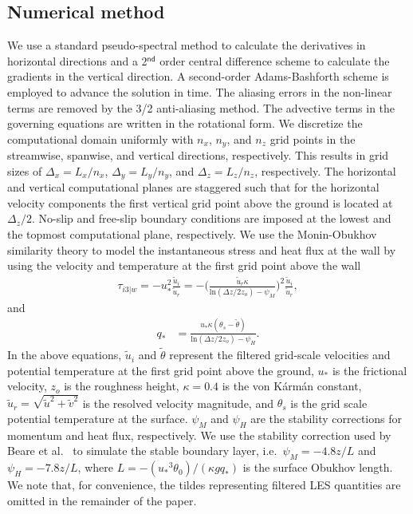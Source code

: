 \documentclass[%
 aip,
 amsmath,amssymb,
preprint,%
author-numerical,%
]{revtex4-1}
\begin{document}
\subsection{Numerical method}\label{sec2.2} 
We use a standard pseudo-spectral method to calculate the derivatives in horizontal directions and a 2$^\mathsf{nd}$ order central difference scheme to calculate the gradients in the vertical direction. A second-order Adams-Bashforth scheme is employed to advance the solution in time. The aliasing errors in the non-linear terms are removed by the 3/2 anti-aliasing method\cite{can88}. The advective terms in the governing equations are written in the rotational form\cite{fer02}. We discretize the computational domain uniformly with $n_x$, $n_y$, and $n_z$ grid points in the streamwise, spanwise, and vertical directions, respectively. This results in grid sizes of $\Delta_{x}=L_x/n_x$, $\Delta_{y}=L_y/n_y$, and $\Delta_{z}=L_z/n_z$, respectively. The horizontal and vertical computational planes are staggered such that for the horizontal velocity components the first vertical grid point above the ground is located at $\Delta_{z}/2$. No-slip and free-slip boundary conditions are imposed at the lowest and the topmost computational plane, respectively. We use the Monin-Obukhov similarity theory \cite{moe84} to model the instantaneous stress and heat flux at the wall by using the velocity and temperature at the first grid point above the wall
%
\begin{align}
\tau_{i3|w}=-{u_{*}^2}\frac{\widetilde{u}_i}{\widetilde{u}_r}=-\Bigg(\frac{\widetilde{u}_r\kappa}{\text{ln}(\Delta{z}/2z_o)-\psi_{M}}\Bigg)^2\frac{\widetilde{u}_i}{\widetilde{u}_r},\label{eqn6}
\end{align}
%
and
%
\begin{align} 
q_{*}&=\frac{u_{*}\kappa(\theta_s-\widetilde{\theta})}{\text{ln}(\Delta{z}/2z_o)-\psi_{H}}.\label{eqn7}
\end{align}
%
\noindent In the above equations, $\widetilde{u}_i$ and $\widetilde{\theta}$ represent the filtered grid-scale velocities and potential temperature at the first grid point above the ground, $u_*$ is the frictional velocity, $z_o$ is the roughness height, $\kappa=0.4$ is the von K\'arm\'an constant, $\widetilde{u}_r=\sqrt{\widetilde{u}^2 + \widetilde{v}^2}$ is the resolved velocity magnitude, and $\theta_s$ is the grid scale potential temperature at the surface. $\psi_M$ and $\psi_H$ are the stability corrections for momentum and heat flux, respectively. We use the stability correction used by Beare et al.\ \cite{bea06} to simulate the stable boundary layer, i.e.\ $\psi_{M}= -4.8z/L$ and $\psi_{H}= -7.8z/L$, where $L=-({u_*}^3\theta_{0})/({\kappa}gq_{*})$ is the surface Obukhov length. We note that, for convenience, the tildes representing filtered LES quantities are omitted in the remainder of the paper.
\end{document}
